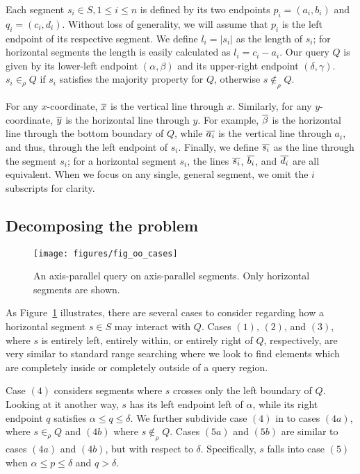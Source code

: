 Each segment $s_i \in S, 1 \leq i \leq n$ is defined by its two endpoints $p_i = (a_i, b_i)$ and $q_i = (c_i, d_i)$. Without loss of generality, we will assume that $p_i$ is the left endpoint of its respective segment. We define $l_i = |s_i|$ as the length of $s_i$; for horizontal segments the length is easily calculated as $l_i = c_i - a_i$. Our query $Q$ is given by its lower-left endpoint $(\alpha, \beta)$ and its upper-right endpoint $(\delta, \gamma)$. $s_i \in_\rho Q$ if $s_i$ satisfies the majority property for $Q$, otherwise $s \not \in_\rho Q$.

For any $x$-coordinate, $\overline{x}$ is the vertical line through $x$. Similarly, for any $y$-coordinate, $\overline{y}$ is the horizontal line through $y$. For example, $\overline{\beta}$ is the horizontal line through the bottom boundary of $Q$, while $\overline{a_i}$ is the vertical line through $a_i$, and thus, through the left endpoint of $s_i$. Finally, we define $\overline{s_i}$ as the line through the segment $s_i$; for a horizontal segment $s_i$, the lines $\overline{s_i}$, $\overline{b_i}$, and $\overline{d_i}$ are all equivalent. When we focus on any single, general segment, we omit the $i$ subscripts for clarity.


\subsection{Decomposing the problem}
\label{:rectangles:ap:approach}

\begin{figure}
\centering
\texttt{[image: figures/fig\_oo\_cases]}
\caption[The different cases of axis-parallel segments]{An axis-parallel query on axis-parallel segments. Only horizontal segments are shown.}
\label{:fig:rectangles:ap:cases}
\end{figure}

As Figure~\ref{:fig:rectangles:ap:cases} illustrates, there are several cases to consider regarding how a horizontal segment $s \in S$ may interact with $Q$. Cases $(1)$, $(2)$, and $(3)$, where $s$ is entirely left, entirely within, or entirely right of $Q$, respectively, are very similar to standard range searching where we look to find elements which are completely inside or completely outside of a query region.  

Case $(4)$ considers segments where $s$ crosses only the left boundary of $Q$. Looking at it another way, $s$ has its left endpoint left of $\alpha$, while its right endpoint $q$ satisfies $\alpha \leq q \leq \delta$.  We further subdivide case $(4)$ in to cases $(4a)$, where $s \in_\rho Q$ and $(4b)$ where $s \not \in_\rho Q$.  Cases $(5a)$ and $(5b)$ are similar to cases $(4a)$ and $(4b)$, but with respect to $\delta$. Specifically, $s$ falls into case $(5)$ when $\alpha \leq p \leq \delta$ and $q > \delta$. 

